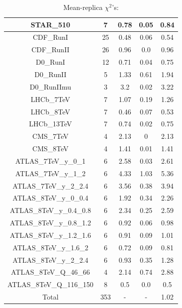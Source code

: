 \documentclass[
]{article}
\begin{document}
\begin{table}[h]
\begin{tabular}{|c|c|c|c|c|}
STAR\_510 & 7 & 0.78 & 0.05 & 0.84 \\ \hline
CDF\_RunI & 25 & 0.48 & 0.06 & 0.54 \\ \hline
CDF\_RunII & 26 & 0.96 & 0.0 & 0.96 \\ \hline
D0\_RunI & 12 & 0.71 & 0.04 & 0.75 \\ \hline
D0\_RunII & 5 & 1.33 & 0.61 & 1.94 \\ \hline
D0\_RunIImu & 3 & 3.2 & 0.02 & 3.22 \\ \hline
LHCb\_7TeV & 7 & 1.07 & 0.19 & 1.26 \\ \hline
LHCb\_8TeV & 7 & 0.46 & 0.07 & 0.53 \\ \hline
LHCb\_13TeV & 7 & 0.74 & 0.02 & 0.75 \\ \hline
CMS\_7TeV & 4 & 2.13 & 0 & 2.13 \\ \hline
CMS\_8TeV & 4 & 1.41 & 0.01 & 1.41 \\ \hline
ATLAS\_7TeV\_y\_0\_1 & 6 & 2.58 & 0.03 & 2.61 \\ \hline
ATLAS\_7TeV\_y\_1\_2 & 6 & 4.33 & 1.03 & 5.36 \\ \hline
ATLAS\_7TeV\_y\_2\_2.4 & 6 & 3.56 & 0.38 & 3.94 \\ \hline
ATLAS\_8TeV\_y\_0\_0.4 & 6 & 1.92 & 0.34 & 2.26 \\ \hline
ATLAS\_8TeV\_y\_0.4\_0.8 & 6 & 2.34 & 0.25 & 2.59 \\ \hline
ATLAS\_8TeV\_y\_0.8\_1.2 & 6 & 0.92 & 0.06 & 0.98 \\ \hline
ATLAS\_8TeV\_y\_1.2\_1.6 & 6 & 0.91 & 0.09 & 1.01 \\ \hline
ATLAS\_8TeV\_y\_1.6\_2 & 6 & 0.72 & 0.09 & 0.81 \\ \hline
ATLAS\_8TeV\_y\_2\_2.4 & 6 & 0.93 & 0.35 & 1.28 \\ \hline
ATLAS\_8TeV\_Q\_46\_66 & 4 & 2.14 & 0.74 & 2.88 \\ \hline
ATLAS\_8TeV\_Q\_116\_150 & 8 & 0.5 & 0.0 & 0.5 \\ \hline
Total & 353 & - & - & 1.02 \\ \hline

\end{tabular}

\caption{Mean-replica \(\chi^2\)'s:}

\end{table}
\end{document}
